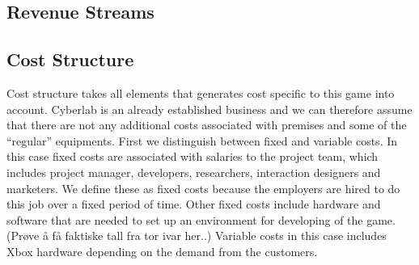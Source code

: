 \subsection{Revenue Streams}
\subsection{Cost Structure}
Cost structure takes all elements that generates cost specific to this game into account. Cyberlab is an already established business and we can therefore assume that there are not any additional costs associated with premises and some of the “regular” equipments. First we distinguish between fixed and variable costs. In this case fixed costs are associated with salaries to the project team, which includes project manager, developers, researchers, interaction designers and marketers. We define these as fixed costs because the employers are hired to do this job over a fixed period of time. Other fixed costs include hardware and software that are needed to set up an environment for developing of the game. (Prøve å få faktiske tall fra tor ivar her..) Variable costs in this case includes Xbox hardware depending on the demand from the customers. 


